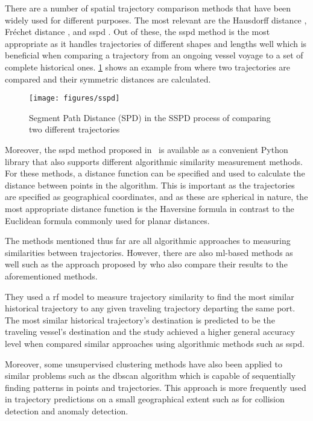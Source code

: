 There are a number of spatial trajectory comparison methods that have been widely used for different purposes. The most relevant are the Hausdorff distance \parencite{magdy2015}, Fréchet distance \parencite{magdy2015}, and \acrfull{sspd} \parencite{besse2015review}. Out of these, the \acrshort{sspd} method is the most appropriate as it handles trajectories of different shapes and lengths well which is beneficial when comparing a trajectory from an ongoing vessel voyage to a set of complete historical ones. \cref{fig:sspd} shows an example from \cite{besse2015review} where two trajectories are compared and their symmetric distances are calculated.

\begin{figure}[htbp]  %
    \centering
    \texttt{[image: figures/sspd]}
    \caption{Segment Path Distance (SPD) in the SSPD process of comparing two different trajectories \parencite{besse2015review}}
    \label{fig:sspd}
\end{figure}

Moreover, the \acrshort{sspd} method proposed in~\cite{besse2015review} is available as a convenient Python library that also supports different algorithmic similarity measurement methods. For these methods, a distance function can be specified and used to calculate the distance between points in the algorithm. This is important as the trajectories are specified as geographical coordinates, and as these are spherical in nature, the most appropriate distance function is the Haversine \parencite{haversine} formula in contrast to the Euclidean formula commonly used for planar distances.

The methods mentioned thus far are all algorithmic approaches to measuring similarities between trajectories. However, there are also \acrshort{ml}-based methods as well such as the approach proposed by \cite{Zhang2020AISApproach} who also compare their results to the aforementioned methods.

They used a \acrfull{rf} model to measure trajectory similarity to find the most similar historical trajectory to any given traveling trajectory departing the same port. The most similar historical trajectory's destination is predicted to be the traveling vessel's destination and the study achieved a higher general accuracy level when compared similar approaches using algorithmic methods such as \acrshort{sspd}.

Moreover, some unsupervised clustering methods have also been applied to similar problems such as the \acrfull{dbscan} algorithm \parencite{dbscan} which is capable of sequentially finding patterns in points and trajectories. This approach is more frequently used in trajectory predictions on a small geographical extent such as for collision detection and anomaly detection.

